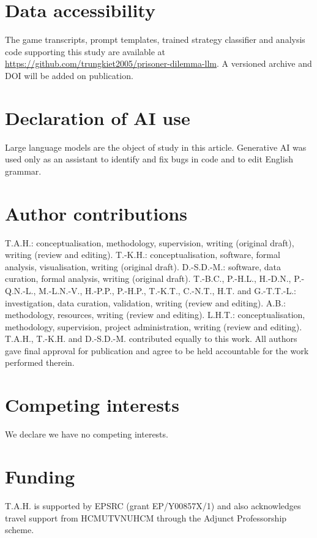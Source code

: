 \documentclass[11pt,a4paper]{article}
\begin{document}
\section*{Data accessibility}
The game transcripts, prompt templates, trained strategy classifier and analysis code supporting this study are available at
\url{https://github.com/trungkiet2005/prisoner-dilemma-llm}. A versioned archive and DOI will be added on publication.

\section*{Declaration of AI use}
Large language models are the object of study in this article. Generative AI was used only as an assistant to identify and fix bugs in code and to edit English grammar.

\section*{Author contributions}
T.A.H.: conceptualisation, methodology, supervision, writing (original draft), writing (review and editing).
T.-K.H.: conceptualisation, software, formal analysis, visualisation, writing (original draft).
D.-S.D.-M.: software, data curation, formal analysis, writing (original draft).
T.-B.C., P.-H.L., H.-D.N., P.-Q.N.-L., M.-L.N.-V., H.-P.P., P.-H.P., T.-K.T., C.-N.T., H.T. and G.-T.T.-L.: investigation, data curation, validation, writing (review and editing).
A.B.: methodology, resources, writing (review and editing).
L.H.T.: conceptualisation, methodology, supervision, project administration, writing (review and editing).
T.A.H., T.-K.H. and D.-S.D.-M. contributed equally to this work.
All authors gave final approval for publication and agree to be held accountable for the work performed therein.

\section*{Competing interests}
We declare we have no competing interests.

\section*{Funding}
T.A.H. is supported by EPSRC (grant EP/Y00857X/1) and also acknowledges travel support from HCMUT\text{-}VNUHCM through the Adjunct Professorship scheme.



\end{document}
